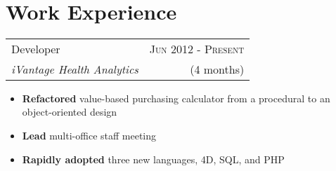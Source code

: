 \documentclass[10pt]{article} %
\begin{document}
\color{text1} %


\par{\\ %


\begin{minipage}[t]{0.5\textwidth}
\vspace{0pt} %


\section{Work Experience}


\begin{tabularx}{\linewidth}{ X r }
  {\large Developer } & {\textsc{Jun 2012 - Present}} \\
  {\small\textit{iVantage Health Analytics}} & {\small{(4 months)}}
\end{tabularx}

\begin{itemize}
  \item \textbf{Refactored} value-based purchasing calculator from a procedural to an object-oriented design
  \item \textbf{Lead} multi-office staff meeting
  \item \textbf{Rapidly adopted} three new languages, 4D, SQL, and PHP
\end{itemize}



\end{minipage}}
\end{document}
